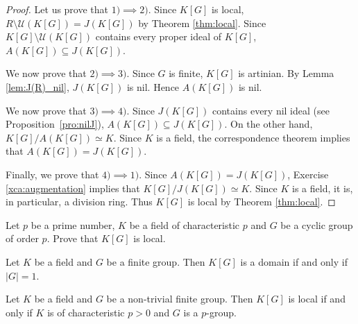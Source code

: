 \begin{proof}
    Let us prove that $1)\implies 2)$. Since $K[G]$ is local, 
    $R\setminus\mathcal{U}(K[G])=J(K[G])$ by Theorem \ref{thm:local}. Since $K[G]\setminus\mathcal{U}(K[G])$ contains 
    every proper ideal of $K[G]$, $A(K[G])\subseteq J(K[G])$. 

    We now prove that $2)\implies 3)$. Since $G$ is finite, $K[G]$ is artinian. By Lemma \ref{lem:J(R)_nil}, 
    $J(K[G])$ is nil. Hence $A(K[G])$ is nil. 

    We now prove that $3)\implies 4)$. Since $J(K[G])$ contains every nil ideal (see Proposition~\ref{pro:nilJ}), 
    $A(K[G])\subseteq J(K[G])$. On the other hand, $K[G]/A(K[G])\simeq K$. Since $K$ is a field, the correspondence theorem
    implies that $A(K[G])=J(K[G])$. 

    Finally, we prove that $4)\implies 1)$. Since $A(K[G])=J(K[G])$, Exercise \ref{xca:augmentation} implies that 
    $K[G]/J(K[G])\simeq K$. Since $K$ is a field, 
    it is, in particular, a division ring. Thus $K[G]$ is local by Theorem \ref{thm:local}.     
\end{proof}


\begin{exercise}
\label{xca:C_p:local}
    Let $p$ be a prime number, $K$ be a field of characteristic $p$ and 
    $G$ be a cyclic group of order $p$. Prove that $K[G]$ is local. 
\end{exercise}


\begin{exercise}
\label{xca:K[G]_domain_easy}
    Let $K$ be a field and $G$ be a finite group. Then 
    $K[G]$ is a domain if and only if $|G|=1$. 
\end{exercise}


\begin{theorem}
    Let $K$ be a field and $G$ be a non-trivial finite group. 
    Then $K[G]$ is local if and only if $K$ is of characteristic $p>0$ and $G$ is a $p$-group. 
\end{theorem}

